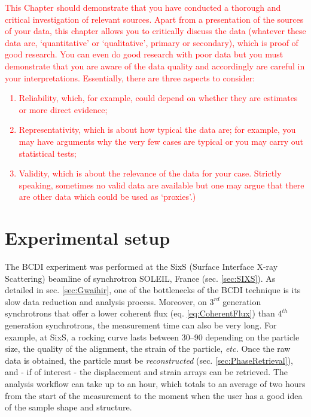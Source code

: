 \textcolor{red}{This Chapter should demonstrate that you have conducted a thorough and critical investigation of relevant sources.
Apart from a presentation of the sources of your data, this chapter allows you to critically discuss the data (whatever these data are, ‘quantitative’ or ‘qualitative’, primary or secondary), which is proof of good research. You can even do good research with poor data but you must demonstrate that you are aware of the data quality and accordingly are careful in your interpretations. Essentially, there are three aspects to consider:
\begin{enumerate}
\item	Reliability, which, for example, could depend on whether they are estimates or more direct evidence;
\item	Representativity, which is about how typical the data are; for example, you may have arguments why the very few cases are typical or you may carry out statistical tests;
\item Validity, which is about the relevance of the data for your case. Strictly speaking, sometimes no valid data are available but one may argue that there are other data which could be used as ‘proxies’.) 
\end{enumerate}
}

\section{Experimental setup}

The BCDI experiment was performed at the SixS (Surface Interface X-ray Scattering) beamline of synchrotron SOLEIL, France (sec. \ref{sec:SIXS}).
As detailed in sec. \ref{sec:Gwaihir}, one of the bottlenecks of the BCDI technique is its slow data reduction and analysis process.
Moreover, on $3^{rd}$ generation synchrotrons that offer a lower coherent flux (eq. \ref{eq:CoherentFlux}) than $4^{th}$ generation synchrotrons, the measurement time can also be very long.
For example, at SixS, a rocking curve lasts between \qtyrange{30}{90}{\min} depending on the particle size, the quality of the alignment, the strain of the particle, \textit{etc.}
Once the raw data is obtained, the particle must be \textit{reconstructed} (sec. \ref{sec:PhaseRetrieval}), and - if of interest - the displacement and strain arrays can be retrieved.
The analysis workflow can take up to an hour, which totals to an average of two hours from the start of the measurement to the moment when the user has a good idea of the sample shape and structure.

